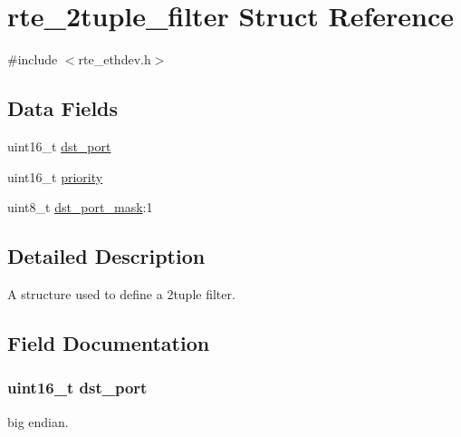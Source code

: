 \hypertarget{structrte__2tuple__filter}{}\section{rte\+\_\+2tuple\+\_\+filter Struct Reference}
\label{structrte__2tuple__filter}


{\ttfamily \#include $<$rte\+\_\+ethdev.\+h$>$}

\subsection*{Data Fields}
\begin{DoxyCompactItemize}
\item 
uint16\+\_\+t \hyperlink{structrte__2tuple__filter_ae18defed4756b8c15e34718f51e86e55}{dst\+\_\+port}
\item 
uint16\+\_\+t \hyperlink{structrte__2tuple__filter_a0815784d41b3c13d42ce22367abfba1d}{priority}
\item 
uint8\+\_\+t \hyperlink{structrte__2tuple__filter_a3c1c59f1493644594dfc6e6907a97936}{dst\+\_\+port\+\_\+mask}\+:1
\end{DoxyCompactItemize}


\subsection{Detailed Description}
A structure used to define a 2tuple filter. 

\subsection{Field Documentation}
\hypertarget{structrte__2tuple__filter_ae18defed4756b8c15e34718f51e86e55}{}
\subsubsection[{dst\+\_\+port}]{\setlength{\rightskip}{0pt plus 5cm}uint16\+\_\+t dst\+\_\+port}\label{structrte__2tuple__filter_ae18defed4756b8c15e34718f51e86e55}
big endian. \hypertarget{structrte__2tuple__filter_a3c1c59f1493644594dfc6e6907a97936}{}
